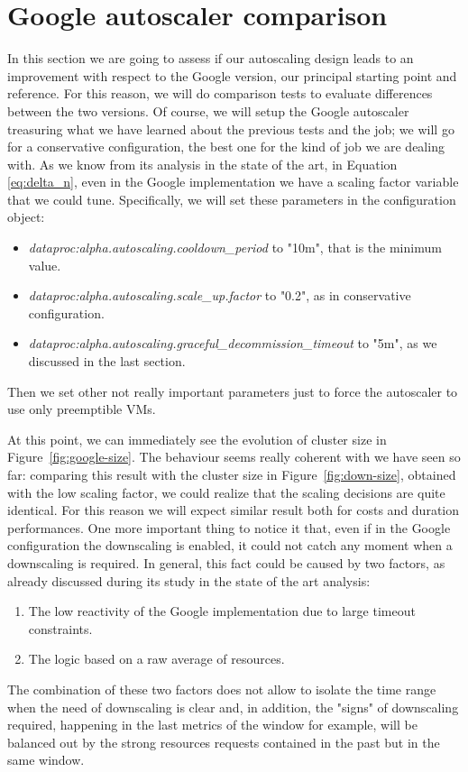 \documentclass[12pt,twoside,cucitura]{toptesi}
\begin{document}
\section{Google autoscaler comparison}
In this section we are going to assess if our autoscaling design leads to an improvement with respect to the Google version, our principal starting point and reference. For this reason, we will do comparison tests to evaluate differences between the two versions. Of course, we will setup the Google autoscaler treasuring what we have learned about the previous tests and the job; we will go for a conservative configuration, the best one for the kind of job we are dealing with. As we know from its analysis in the state of the art, in Equation \ref{eq:delta_n}, even in the Google implementation we have a scaling factor variable that we could tune. Specifically, we will set these parameters in the configuration object:
\begin{itemize}
	\item \textit{dataproc:alpha.autoscaling.cooldown\_period} to "10m", that is the minimum value.
	\item \textit{dataproc:alpha.autoscaling.scale\_up.factor} to "0.2", as in conservative configuration.
	\item \textit{dataproc:alpha.autoscaling.graceful\_decommission\_timeout} to "5m", as we discussed in the last section.
\end{itemize}
Then we set other not really important parameters just to force the autoscaler to use only preemptible VMs.

At this point, we can immediately see the evolution of cluster size in Figure~\ref{fig:google-size}. The behaviour seems really coherent with we have seen so far: comparing this result with the cluster size in Figure~\ref{fig:down-size}, obtained with the low scaling factor, we could realize that the scaling decisions are quite identical. For this reason we will expect similar result both for costs and duration performances. One more important thing to notice it that, even if in the Google configuration the downscaling is enabled, it could not catch any moment when a downscaling is required. In general, this fact could be caused by two factors, as already discussed during its study in the state of the art analysis:
\begin{enumerate}
	\item The low reactivity of the Google implementation due to large timeout constraints. 
	\item The logic based on a raw average of resources.
\end{enumerate}
The combination of these two factors does not allow to isolate the time range when the need of downscaling is clear and, in addition, the "signs" of downscaling required, happening in the last metrics of the window for example, will be balanced out by the strong resources requests contained in the past but in the same window.
\end{document}
